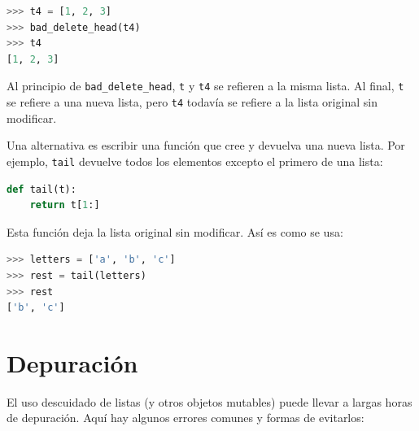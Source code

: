 \begin{lstlisting}[language=Python]
>>> t4 = [1, 2, 3] 
>>> bad_delete_head(t4) 
>>> t4 
[1, 2, 3]
\end{lstlisting}

Al principio de \texttt{bad\_delete\_head}, \texttt{t} y \texttt{t4} se refieren a la misma lista. Al final, \texttt{t} se refiere a una nueva lista, pero \texttt{t4} todavía se refiere a la lista original sin modificar.

Una alternativa es escribir una función que cree y devuelva una nueva lista. Por ejemplo, \texttt{tail} devuelve todos los elementos excepto el primero de una lista:

\begin{lstlisting}[language=Python]
def tail(t):
    return t[1:]
\end{lstlisting}

Esta función deja la lista original sin modificar. Así es como se usa:

\begin{lstlisting}[language=Python]
>>> letters = ['a', 'b', 'c'] 
>>> rest = tail(letters) 
>>> rest 
['b', 'c']
\end{lstlisting}

\section{Depuración}

El uso descuidado de listas (y otros objetos mutables) puede llevar a largas horas de depuración. Aquí hay algunos errores comunes y formas de evitarlos:

